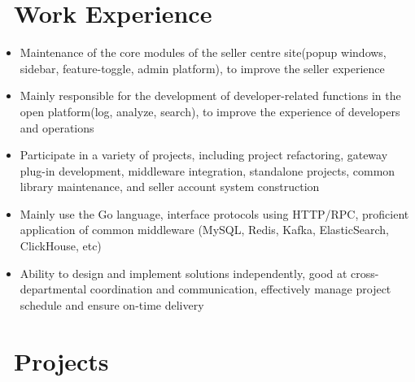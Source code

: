 \documentclass{resume}
\newcommand{\en}[1]{#1}
\newcommand{\zh}[1]{}
\begin{document}
\section{\faBriefcase\ \en{Work Experience}\zh{工作经历}}
\en{}
\zh{\datedsubsection{\textbf{\href{https://www.sea.com/products/shopee/}{深圳虾皮信息科技发展有限公司}}}{2021/07 -- 至今}}
\en{}
\zh{\role{卖家平台 \& Shopee 开放平台}{后端开发工程师}}
\begin{itemize}[parsep=0.5ex]
      \item \en{Maintenance of the core modules of the seller centre site(popup windows, sidebar, feature-toggle, admin platform), to improve the seller experience}
            \zh{在卖家平台负责开发和维护主站核心模块(首页弹窗、侧边栏、功能开关、Admin 平台),提升卖家及运营使用体验}
      \item \en{Mainly responsible for the development of developer-related functions in the open platform(log, analyze, search), to improve the experience of developers and operations}
            \zh{在开放平台主要负责开发者相关功能的开发(日志、分析、搜索),提升开发者及运营体验}
      \item \en{Participate in a variety of projects, including project refactoring, gateway plug-in development, middleware integration, standalone projects, common library maintenance, and seller account system construction}
            \zh{参与多元化项目,包括项目重构、网关开发、中间件集成、独立项目、Common库维护及卖家账号系统构建等}
      \item \en{Mainly use the Go language, interface protocols using HTTP/RPC, proficient application of common middleware (MySQL, Redis, Kafka, ElasticSearch, ClickHouse, etc)}
            \zh{主要使用 Go 语言,接口协议采用 HTTP/RPC,熟练应用常用中间件(MySQL,Redis,Kafka,ElasticSearch,ClickHouse,etc)}
      \item \en{Ability to design and implement solutions independently, good at cross-departmental coordination and communication, effectively manage project schedule and ensure on-time delivery}
            \zh{具有独立设计和实施解决方案的能力,善于跨部门协作与沟通,有效管理项目进度并确保按时交付}
\end{itemize}

\section{\faCloud\ \en{Projects}\zh{工作项目}}
\end{document}
